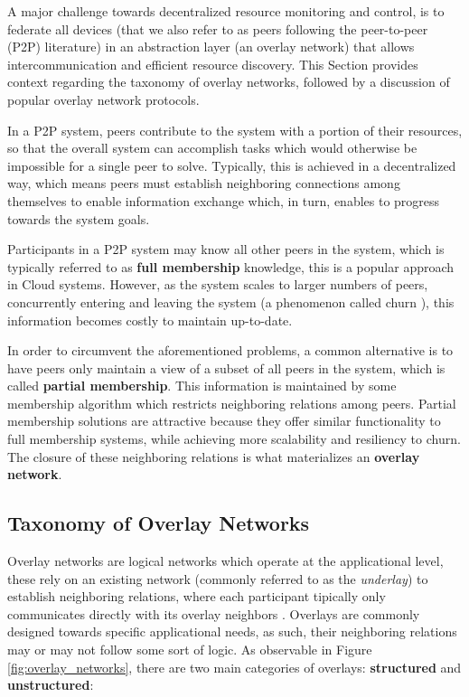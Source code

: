 

A major challenge towards decentralized resource monitoring and control, is to federate all devices (that we also refer to as peers following the peer-to-peer (P2P) literature) in an abstraction layer (an overlay network) that allows intercommunication and efficient resource discovery. This Section provides context regarding the taxonomy of overlay networks, followed by a discussion of popular overlay network protocols.

In a P2P system, peers contribute to the system with a portion of their resources, so that the overall system can accomplish tasks which would otherwise be impossible for a single peer to solve. Typically, this is achieved in a decentralized way, which means peers must establish neighboring connections among themselves to enable information exchange which, in turn, enables to progress towards the system goals. 

Participants in a P2P system may know all other peers in the system, which is typically referred to as \textbf{full membership} knowledge, this is a popular approach in Cloud systems. However, as the system scales to larger numbers of peers, concurrently entering and leaving the system (a phenomenon called churn \cite{stutzbach2006understanding}), this information becomes costly to maintain up-to-date. 

In order to circumvent the aforementioned problems, a common alternative is to have peers only maintain a view of a subset of all peers in the system, which is called \textbf{partial membership}. This information is maintained by some membership algorithm which restricts neighboring relations among peers. Partial membership solutions are attractive because they offer similar functionality to full membership systems, while achieving more scalability and resiliency to churn. The closure of these neighboring relations is what materializes an \textbf{overlay network}.

\subsection{Taxonomy of Overlay Networks}

Overlay networks are logical networks which operate at the applicational level, these rely on an existing network (commonly referred to as the \textit{underlay}) to establish neighboring relations, where each participant tipically only communicates directly with its overlay neighbors \cite{leitaoPHDthesis}. Overlays are commonly designed towards specific applicational needs, as such, their neighboring relations may or may not follow some sort of logic. As observable in Figure \ref{fig:overlay_networks}, there are two main categories of overlays: \textbf{structured} and \textbf{unstructured}:

